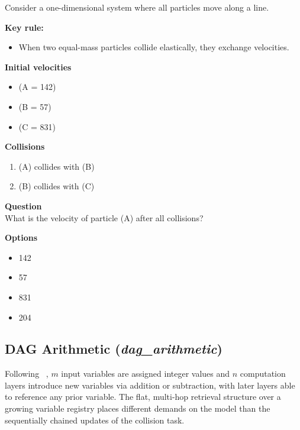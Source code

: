 \documentclass[11pt]{article}
\theoremstyle{definition}
\begin{document}
\begin{tcolorbox}[colback=gray!5!white, colframe=gray!75!black, title=Example Prompt, breakable]
\small

Consider a one-dimensional system where all particles move along a line.

\textbf{Key rule:}
\begin{itemize}
\item When two equal-mass particles collide elastically, they exchange velocities.
\end{itemize}

\textbf{Initial velocities}
\begin{itemize}
\item (A = 142)
\item (B = 57)
\item (C = 831)
\end{itemize}

\textbf{Collisions}
\begin{enumerate}
\item (A) collides with (B)
\item (B) collides with (C)
\end{enumerate}

\textbf{Question}\\
What is the velocity of particle (A) after all collisions?

\textbf{Options}
\begin{itemize}
\item[A)] 142
\item[B)] 57
\item[C)] 831
\item[D)] 204
\end{itemize}
\end{tcolorbox}

\subsection{DAG Arithmetic (\textit{dag\_arithmetic})}

Following ~\cite{motwani2026longcot}, $m$ input variables are assigned integer values and $n$ computation layers introduce new variables via addition or subtraction, with later layers able to reference any prior variable. The flat, multi-hop retrieval structure over a growing variable registry places different demands on the model than the sequentially chained updates of the collision task.
\end{document}
